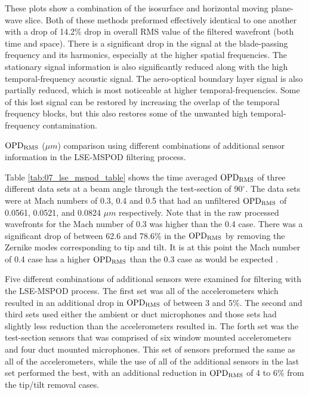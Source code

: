 These plots show a combination of the isosurface and horizontal moving plane-wave slice.
Both of these methods preformed effectively identical to one another with a drop of 14.2\% drop in overall RMS value of the filtered wavefront (both time and space).
There is a significant drop in the signal at the blade-passing frequency and its harmonics, especially at the higher spatial frequencies.
The stationary signal information is also significantly reduced along with the high temporal-frequency acoustic signal.
The aero-optical boundary layer signal is also partially reduced, which is most noticeable at higher temporal-frequencies.
Some of this lost signal can be restored by increasing the overlap of the temporal frequency blocks, but this also restores some of the unwanted high temporal-frequency contamination.

\begin{table}
  \centering
  \caption{$\operatorname{OPD_{RMS}}$ ($\mu m$) comparison using different combinations of additional sensor information in the LSE-MSPOD filtering process.}
  
  \label{tab:07_lse_mspod_table}
\end{table}

Table \ref{tab:07_lse_mspod_table} shows the time averaged $\operatorname{OPD_{RMS}}$ of three different data sets at a beam angle through the test-section of $90^\circ$.
The data sets were at Mach numbers of 0.3, 0.4 and 0.5 that had an unfiltered $\operatorname{OPD_{RMS}}$ of 0.0561, 0.0521, and 0.0824 $\mu m$ respectively.
Note that in the raw processed wavefronts for the Mach number of 0.3 was higher than the 0.4 case.
There was a significant drop of between 62.6 and 78.6\% in the $\operatorname{OPD_{RMS}}$ by removing the Zernike modes corresponding to tip and tilt.
It is at this point the Mach number of 0.4 case has a higher $\operatorname{OPD_{RMS}}$ than the 0.3 case as would be expected {\color{red}{Reference an equation or source (probably a non-dimensionalization equation)}}.

Five different combinations of additional sensors were examined for filtering with the LSE-MSPOD process.
The first set was all of the accelerometers which resulted in an additional drop in $\operatorname{OPD_{RMS}}$ of between 3 and 5\%.
The second and third sets used either the ambient or duct microphones and those sets had slightly less reduction than the accelerometers resulted in.
The forth set was the test-section sensors that was comprised of six window mounted accelerometers and four duct mounted microphones.
This set of sensors preformed the same as all of the accelerometers, while the use of all of the additional sensors in the last set performed the best, with an additional reduction in $\operatorname{OPD_{RMS}}$ of 4 to 6\% from the tip/tilt removal cases.

